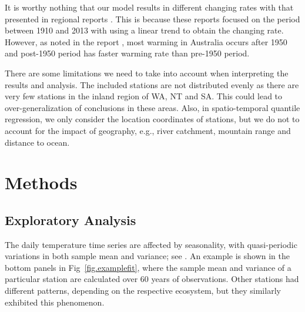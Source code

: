 \documentclass[fleqn,10pt]{wlscirep}
\begin{document}
It is worthy nothing that our model results in different changing rates with that presented in regional reports \cite{Ekst2015,Moise2015,Timbal2015,Watterson2015,Grose2015,Hope2015,McInnes2015}. This is because these reports focused on the period between 1910 and 2013 with using a linear trend to obtain the changing rate. However, as noted in the report \cite{BOMCSIRO2018}, most warming in Australia occurs after 1950 and post-1950 period has faster warming rate than pre-1950 period.

There are some limitations we need to take into account when interpreting the results and analysis.
The included stations are not distributed evenly as there are very few stations in the inland region of WA, NT and SA. This could lead to over-generalization of conclusions in these areas. Also, in spatio-temporal quantile regression, we only consider the location coordinates of stations, but we do not to account for the impact of geography, e.g., river catchment, mountain range and distance to ocean. %

\section*{Methods}
\subsection*{Exploratory Analysis}
\label{sec:preli}

The daily temperature time series are affected by seasonality, with quasi-periodic variations in both sample mean and variance; see \cite{campbell2005weather,benth2007volatility,benth2007spatial,sirangelo2017stochastic}. An example is shown in the bottom panels in Fig~\ref{fig.examplefit}, where the sample mean and variance of a particular station are calculated over 60 years of observations. %
Other stations had different patterns, depending on the respective ecosystem, but they similarly exhibited this phenomenon.
\end{document}
